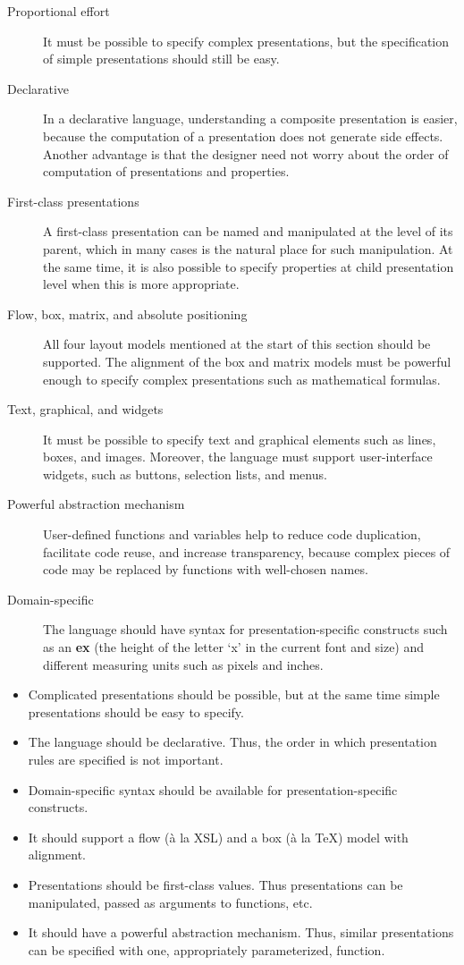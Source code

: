 \begin{description}
\item[Proportional effort]
It must be possible to specify complex presentations, but the specification of simple presentations should still be easy.
\item[Declarative]
In a declarative language, understanding a composite presentation is easier, because the computation of a presentation does not generate side effects. Another advantage is that the designer need not worry about the order of computation of presentations and properties.
\item[First-class presentations]
A first-class presentation can be named and manipulated at the level of its parent, which in many cases is the natural place for such manipulation. At the same time, it is also possible to specify properties at child presentation level when this is more appropriate.
\item[Flow, box, matrix, and absolute positioning]
All four layout models mentioned at the start of this section should be supported. The alignment of the box and matrix models must be powerful enough to specify complex presentations such as mathematical formulas.
\item[Text, graphical, and widgets]
It must be possible to specify text and graphical elements such as lines, boxes, and images. Moreover, the language must support user-interface widgets, such as buttons, selection lists, and menus. 
\item[Powerful abstraction mechanism]
User-defined functions and variables help to reduce code duplication, facilitate code reuse, and increase transparency, because complex pieces of code may be replaced by functions with well-chosen names.
\item[Domain-specific]
The language should have syntax for presentation-specific constructs such as an {\bf ex} (the height of the letter `x' in the current font and size) and different measuring units such as pixels and inches.
\end{description}
\bc
\begin{itemize}
\item Complicated presentations should be possible, but at the same time simple presentations should be easy to specify.
\item The language should be declarative. Thus, the order in which presentation rules are specified is not important.
\item Domain-specific syntax should be available for presentation-specific constructs. 
\item It should support a flow (\`a la XSL) and a box (\`a la \TeX) model with alignment.
\item Presentations should be first-class values. Thus presentations can be manipulated, passed as arguments to functions, etc.
\item It should have a powerful abstraction mechanism. Thus, similar presentations can be specified with one, appropriately parameterized, function.
\end{itemize}
\ec



